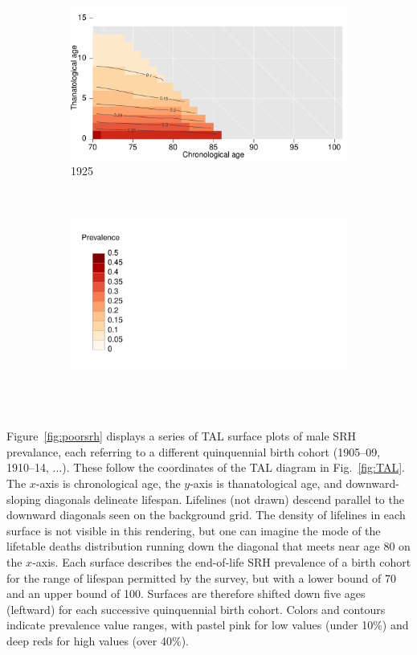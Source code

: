 \documentclass[12pt,oneside,a4paper]{article} %
\theoremstyle{definition}
\begin{document}
\begin{figure}[h!]
\begin{subfigure}{.46\textwidth}
\centering
\caption{1925}
\vspace{-1em}
\label{fig:srh1925}
\includegraphics[scale=0.32]{Figures/TALapplication/srhpoor1925.pdf}
\end{subfigure}
~
\begin{subfigure}{.46\textwidth}
\centering
\caption*{~}
\vspace{-1em}
\label{fig:srhlegend}
\includegraphics[scale=0.32]{Figures/TALapplication/Legend.pdf}
\end{subfigure}
\end{figure} 

Figure~\ref{fig:poorsrh} displays a series of TAL surface plots of male SRH
prevalance, each referring to a different quinquennial birth cohort (1905--09, 1910--14, $\dots$). These follow the coordinates of the TAL diagram in Fig.~\ref{fig:TAL}.
The $x$-axis is chronological age, the $y$-axis is thanatological age, and
downward-sloping diagonals delineate lifespan. Lifelines (not drawn) descend
parallel to the downward diagonals seen on the background grid. The density of
lifelines in each surface is not visible in this rendering, but one can imagine
the mode of the lifetable deaths distribution running down the diagonal that
meets near age 80 on the $x$-axis. Each surface describes the end-of-life SRH
prevalence of a birth cohort for the range of lifespan permitted by the survey,
but with a lower bound of 70 and an upper bound of 100. Surfaces are therefore
shifted down five ages (leftward) for each successive quinquennial birth cohort.
Colors and contours indicate prevalence value ranges, with pastel pink for low
values (under 10\%) and deep reds for high values (over 40\%).
\end{document}
